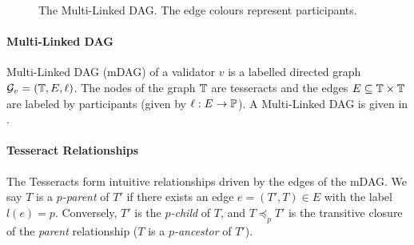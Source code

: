 \begin{figure}
\caption{The Multi-Linked DAG. The edge colours represent participants.}
\label{fig:mdag}
\end{figure}

\paragraph{\textbf{Multi-Linked DAG}}
Multi-Linked DAG (mDAG) of a validator $v$ is a labelled directed graph $\mathcal{G}_v=(\mathbb{T}, E, \ell)$. The nodes of the graph $\mathbb{T}$ are tesseracts and the edges $E \subseteq \mathbb{T} \times \mathbb{T}$ are labeled by participants (given by $\ell: E \to \mathbb{P}$). A Multi-Linked DAG is given in .


\paragraph{\textbf{Tesseract Relationships}}
The Tesseracts form intuitive relationships driven by the edges of the mDAG. We say $T$ is a \textit{$p$-parent} of $T'$ if there exists an edge $e=(T', T) \in E$ with the label $l(e)=p$. Conversely, $T'$ is the \textit{$p$-child} of $T$, and $T\preceq_p T'$ is the transitive closure of the \textit{parent} relationship ($T$ is a \textit{$p$-ancestor} of $T'$).

